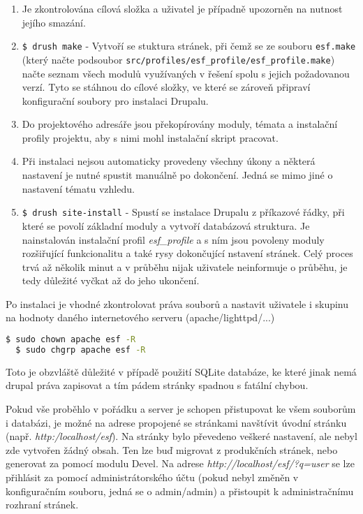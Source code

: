 \begin{enumerate}
  \item Je zkontrolována cílová složka a uživatel je případně upozorněn na nutnost jejího smazání.
  \item \lstinline[language=bash]{$ drush make} - Vytvoří se stuktura stránek, při čemž se ze souboru \texttt{esf.make} (který načte podsoubor \texttt{src/profiles/esf\_profile/esf\_profile.make}) načte seznam všech modulů využívaných v řešení spolu s jejich požadovanou verzí. Tyto se stáhnou do cílové složky, ve které se zároveň připraví konfigurační soubory pro instalaci Drupalu.
  \item Do projektového adresáře jsou překopírovány moduly, témata a instalační profily projektu, aby s nimi mohl instalační skript pracovat.
  \item Při instalaci nejsou automaticky provedeny všechny úkony a některá nastavení je nutné spustit manuálně po dokončení. Jedná se mimo jiné o nastavení tématu vzhledu.
  \item \lstinline[language=bash]{$ drush site-install} - Spustí se instalace Drupalu z příkazové řádky, při které se povolí základní moduly a vytvoří databázová struktura. Je nainstalován instalační profil \emph{esf\_profile} a s ním jsou povoleny moduly rozšiřující funkcionalitu a také rysy dokončující nstavení stránek. Celý proces trvá až několik minut a v průběhu nijak uživatele neinformuje o průběhu, je tedy důležité vyčkat až do jeho ukončení.
\end{enumerate}

Po instalaci je vhodné zkontrolovat práva souborů a nastavit uživatele i skupinu na hodnoty daného internetového serveru (apache/lighttpd/...)

\begin{lstlisting}[language=bash]
  $ sudo chown apache esf -R 
  $ sudo chgrp apache esf -R
\end{lstlisting}

Toto je obzvláště důležité v případě použití SQLite databáze, ke které jinak nemá drupal práva zapisovat a tím pádem stránky spadnou s fatální chybou. 

Pokud vše proběhlo v pořádku a server je schopen přistupovat ke všem souborům i databázi, je možné na adrese propojené se stránkami navštívit úvodní stránku (např. \emph{http:/localhost/esf}). Na stránky bylo převedeno veškeré nastavení, ale nebyl zde vytvořen žádný obsah. Ten lze buď migrovat z produkčních stránek, nebo generovat za pomocí modulu Devel. Na adrese \emph{http://localhost/esf/?q=user} se lze přihlásit za pomocí administrátorského účtu (pokud nebyl změněn v konfiguračním souboru, jedná se o admin/admin) a přistoupit k administračnímu rozhraní stránek.

